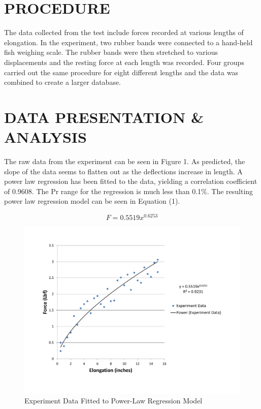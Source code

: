 \documentclass[12pt]{article}
\begin{document}
\section*{\fontsize{12}{12}\selectfont PROCEDURE}
The data collected from the test include forces recorded at various lengths of elongation. In the experiment, two rubber bands were connected to a hand-held fish weighing scale. The rubber bands were then stretched to various displacements and the resting force at each length was recorded. Four groups carried out the same procedure for eight different lengths and the data was combined to create a larger database.


\section*{\fontsize{12}{12}\selectfont DATA PRESENTATION \& ANALYSIS}
The raw data from the experiment can be seen in Figure 1. As predicted, the slope of the data seems to flatten out as the deflections increase in length. A power law regression has been fitted to the data, yielding a correlation coefficient of 0.9608. The Pr range for the regression is much less than 0.1\%. The resulting power law regression model can be seen in Equation (1). 
\bigskip

\begin{equation}
F = 0.5519x^{0.6253}
\end{equation}

\begin{figure}[t!] %
   \centering
   \includegraphics[width=\linewidth]{power_regression.pdf} 
   \caption{Experiment Data Fitted to Power-Law Regression Model}
   \label{fig:example}
\end{figure}
\end{document}
